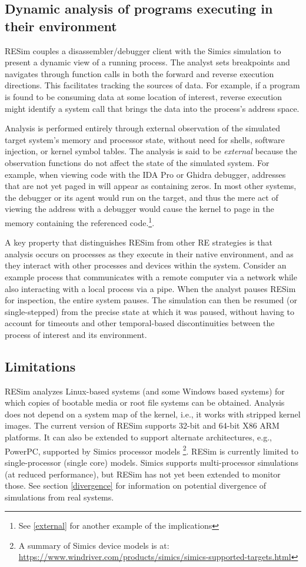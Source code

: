 \documentclass[titlepage]{article}
\begin{document}
\subsection{Dynamic analysis of programs executing in their environment}
RESim couples a disassembler/debugger client with the Simics simulation to present a dynamic view of a running process.  The analyst sets breakpoints and navigates through function calls in both the forward and reverse execution directions.  This facilitates tracking the sources of data.  For example, if a program is found to be consuming data at some location of interest, reverse execution might identify a system call that brings the data into the process’s address space.

Analysis is performed entirely through external observation of the simulated target system's memory and processor state, 
without need for shells, software injection, or kernel symbol tables.   The analysis is said to be \textit{external} because the observation functions do
not affect the state of the simulated system.  For example, when viewing code with the IDA Pro or Ghidra debugger, addresses that are not yet paged in will appear as containing zeros.
In most other systems, the debugger or its agent would run on the target, and thus the mere act of viewing the address with a debugger 
would cause the kernel to page
in the memory containing the referenced code.\footnote{See \ref{external} for another example of the implications}.

A key property that distinguishes RESim from other RE strategies is that analysis occurs on processes as they execute in their native environment, and as they interact with other processes and devices within the system.  Consider an example process that communicates with a remote computer via a network while also interacting with a local process via a pipe.  When the analyst pauses RESim for inspection, the entire system pauses.  The simulation can then be resumed (or single-stepped) from the precise state at which it was paused, without having to account for timeouts and other temporal-based discontinuities between the process of interest and its environment.

\subsection{Limitations}
RESim analyzes Linux-based systems (and some Windows based systems) for which copies of bootable media or root file systems can be obtained.  Analysis does not depend on a system map of the kernel, i.e., it works with stripped kernel images.  The current version of RESim supports 32-bit and 64-bit X86 ARM platforms.  It can also be 
extended to support alternate architectures, e.g., PowerPC, supported by Simics processor models \footnote{A summary of Simics device models is at: \url{https://www.windriver.com/products/simics/simics-supported-targets.html}}.  RESim is currently limited to single-processor (single core) models.  Simics supports
multi-processor simulations (at reduced performance), but RESim has not yet been extended to monitor those.
See section \ref{divergence} for information on potential divergence of simulations from real systems.
\end{document}
